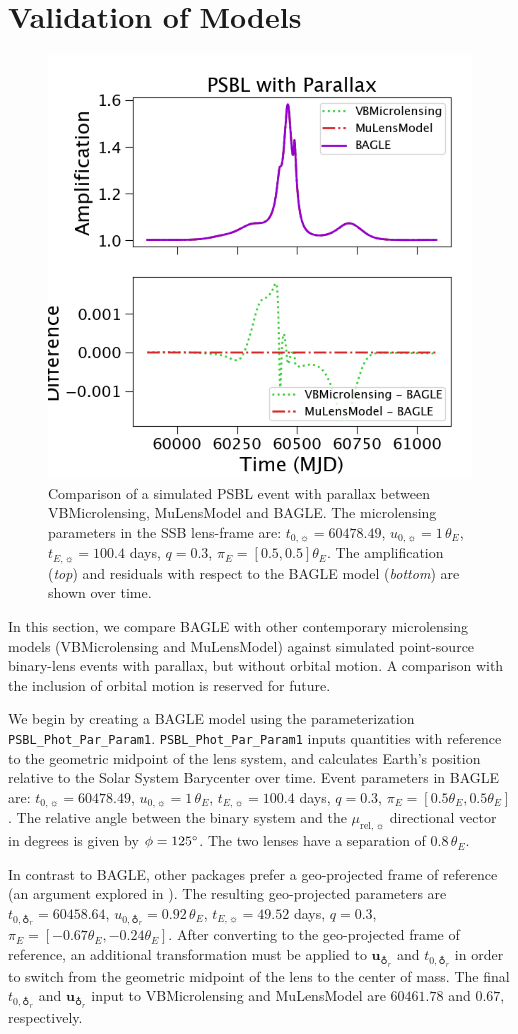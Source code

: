 \documentclass[twocolumn]{aastex701}
\newcommand{\geotr}{\earth_r}
\newcommand{\vect}[1]{\boldsymbol{#1}}
\newcommand{\murel}{\mu_{\mathrm{rel},\sun}}
\newcommand{\tnot}{t_{0,\sun}}
\newcommand{\uvecgeotr}{\vect{u}_{\geotr}}
\newcommand{\tE}{t_{E,\sun}}
\newcommand{\thetaE}{\theta_E}
\newcommand{\uo}{u_{0,\sun}}
\newcommand{\uogeotr}{u_{0,\geotr}}
\newcommand{\piE}{\pi_E}
\newcommand{\tnotgeotr}{t_{0,\geotr}}
\begin{document}
\section{Validation of Models}
\label{sec:validation}

\begin{figure}
    \centering
    \includegraphics[width= .48 \textwidth]{figures/parallax_comparison.png}
    \caption{Comparison of a simulated PSBL event with parallax between VBMicrolensing, MuLensModel and BAGLE. The microlensing parameters in the SSB lens-frame are: $\tnot = 60478.49$, $\uo=1 \,\thetaE$, $\tE = 100.4$ days, $q = 0.3$, $\piE = [0.5, 0.5] \thetaE$. The amplification  ({\em top}) and residuals with respect to the BAGLE model ({\em bottom}) are shown over time.}
    \label{fig:parallax_comparison}
\end{figure}


In this section, we compare BAGLE with other contemporary microlensing models (VBMicrolensing and MuLensModel) against simulated point-source binary-lens events with parallax, but without orbital motion. A comparison with the inclusion of orbital motion is reserved for future. 

We begin by creating a BAGLE model using the parameterization \texttt{PSBL\_Phot\_Par\_Param1}. \texttt{PSBL\_Phot\_Par\_Param1} inputs quantities with reference to the geometric midpoint of the lens system, and calculates Earth's position relative to the Solar System Barycenter over time. Event parameters in BAGLE are: $\tnot = 60478.49$, $\uo=1 \,\thetaE$, $\tE = 100.4$ days, $q = 0.3$, $\piE = [0.5\thetaE, 0.5\thetaE]$. The relative angle between the binary system and the $\murel$ directional vector in degrees is given by $\phi=125 \degree$. The two lenses have a separation of $0.8 \,\thetaE$. 

In contrast to BAGLE, other packages prefer a geo-projected frame of reference (an argument explored in \citet{Lu:2025}). The resulting geo-projected parameters are  $\tnotgeotr = 60458.64$, $\uogeotr= 0.92 \,\thetaE$, $\tE = 49.52$ days, $q = 0.3$, $\piE = [-0.67 \thetaE, -0.24 \thetaE] $. After converting to the geo-projected frame of reference, an additional transformation must be applied to $\uvecgeotr$ and $\tnotgeotr$ in order to switch from the geometric midpoint of the lens to the center of mass. The final $\tnotgeotr$ and $\uvecgeotr$ input to VBMicrolensing and MuLensModel are $60461.78$ and $0.67$, respectively. 
\end{document}
